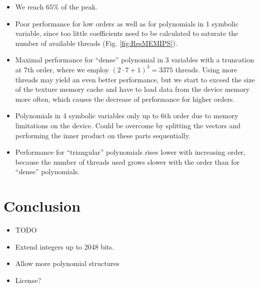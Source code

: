 \documentclass[oribibl]{llncs2e/llncs}
\begin{document}
\begin{itemize}
\item We reach $65\%$ of the peak.
\item Poor performance for low orders as well as for polynomials in 1 symbolic variable, since too little coefficients need to be calculated to saturate the number of available threads (Fig. \ref{fig:ResMEMIPS}).
\item Maximal performance for ``dense'' polynomial in 3 variables with a truncation at 7th order, where we employ $(2\cdot7+1)^3 = 3375$ threads. Using more threads may yield an even better performance, but we start to exceed the size of the texture memory cache and have to load data from the device memory more often, which causes the decrease of performance for higher orders.
\item Polynomials in 4 symbolic variables only up to 6th order due to memory limitations on the device. Could be overcome by splitting the vectors and performing the inner product on these parts sequentially.
\item Performance for ``triangular'' polynomials rises lower with increasing order, because the number of threads used grows slower with the order than for ``dense'' polynomials.
\end{itemize}


\section{Conclusion}
\begin{itemize}
\item TODO
\item Extend integers up to 2048 bits.
\item Allow more polynomial structures
\item License?
\end{itemize}



\end{document}

